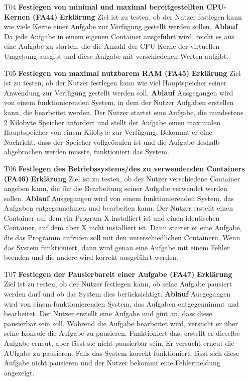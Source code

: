 \documentclass[a4paper,12pt]{article}
\begin{document}
\begin{itemize}
\item[T04] \textbf{Festlegen von minimal und maximal bereitgestellten CPU-Kernen (FA44)}
\subitem \textbf{Erklärung} Ziel ist zu testen, ob der Nutzer festlegen kann wie viele Kerne einer Aufgabe zur Verfügung gestellt werden sollen.
\subitem \textbf{Ablauf} Da jede Aufgabe in einem eigenen Container ausgeführt wird, reicht es aus eine Aufgabe zu starten, die die Anzahl der CPU-Kerne der virtuellen Umgebung ausgibt und diese Aufgabe mit verschiedenen Werten aufgibt.

\item[T05] \textbf{Festlegen von maximal nutzbarem RAM (FA45)}
\subitem \textbf{Erklärung} Ziel ist zu testen, ob der Nutzer festlegen kann wie viel Hauptspeicher seiner Anwendung zur Verfügung gestellt werden soll.
\subitem \textbf{Ablauf} Ausgegangen wird von einem funktionierenden System, in dem der Nutzer Aufgaben erstellen kann, die bearbeitet werden.
Der Nutzer startet eine Aufgabe, die mindestens 2 Kilobyte Speicher anfordert und stellt der Aufgabe einen maximalen Hauptspeicher von einem Kilobyte zur Verfügung.
Bekommt er eine Nachricht, dass der Speicher vollgeöaufen ist und die Aufgabe deshalb abgebrochen werden musste, funktioniert das System.

\item[T06] \textbf{Festlegen des Betriebssystems/des zu verwendenden Containers (FA46)}
\subitem \textbf{Erklärung} Ziel ist zu testen, ob der Nutzer verschiedene Container angeben kann, die für die Bearbeitung seiner Aufgabe verwendet werden sollen.
\subitem \textbf{Ablauf} Ausgegangen wird von einem funktionierenden System, das Aufgaben entgegennehmen und bearbeiten kann.
Der Nutzer erstellt einen Container auf dem ein Program X installiert ist und einen identischen Container, auf dem aber X nicht installiert ist.
Dann startet er eine Aufgabe, die das Programm aufrufen soll mit den unterschiedlichen Containern. Wenn das System funktioniert, dann wird genau eine Aufgabe mit einem Fehler beenden und die andere wird korrekt ausgeführt werden.

\item[T07] \textbf{Festlegen der Pausierbareit einer Aufgabe (FA47)}
\subitem \textbf{Erklärung} Ziel ist zu testen, ob der Nutzer festlegen kann, ob seine Aufgabe pausiert werden darf und ob das System dies berücksichtigt.
\subitem \textbf{Ablauf} Ausgegangen wird von einem funktionierenden System, das Aufgaben entgegennimmt und bearbeitet.
Der Nutzer erstellt eine Aufgabe und gint an, dass diese pausierbar sein soll. Während die Aufgabe bearbeitet wird, versucht er über seine Konsole die Aufgabe zu pausieren.
Funktioniert das, erstellt er dieselbe Aufgabe erneut, aber lässt sie nicht pausierbar sein. Er versucht erneut die AUfgabe zu pausieren.
Falls das System korrekt funktioniert, lässt sich diese Aufgabe nicht pausieren und der Nutzer bekommt eine Fehlermeldung angezeigt.


\end{itemize}
\end{document}
